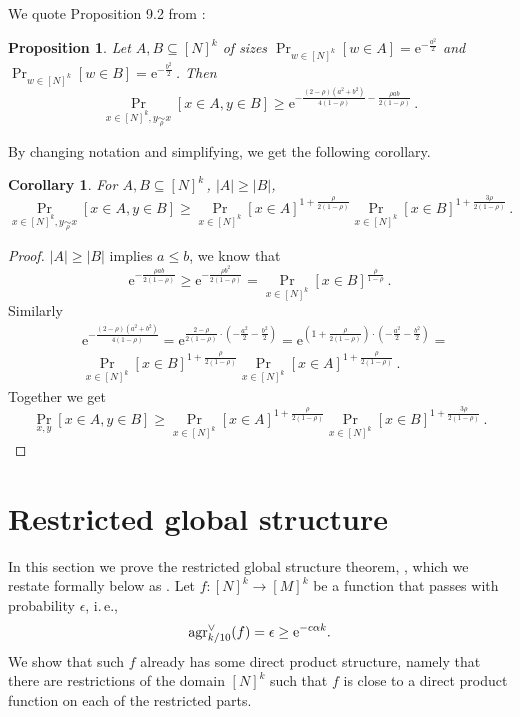 \documentclass[11pt]{article}
\numberwithin{equation}{section}
\newtheorem{proposition}[theorem]{Proposition}
\newtheorem{corollary}[theorem]{Corollary}
\theoremstyle{definition}
\theoremstyle{plain}
\newcommand{\eee}{\mathrm e}
\newcommand{\ie}{i.\,e.}
\newcommand\f{f} %
\newcommand{\test}[2]{
	\ifx &#2&
	\textrm{agr}^{#1}
	\else	
	\textrm{agr}^{#1}_{#2}
	\fi}
\newcommand\cor[1]{\underset{\scriptscriptstyle#1}{\sim}} %
\begin{document}
We quote Proposition 9.2 from \cite{mossel2013reverse}:
\begin{proposition}
  Let $A,B \subseteq [N]^k$ of sizes $\Pr_{w\in [N]^k}[w\in A] = \eee^{-\frac{a^2}{2}}$ and $\Pr_{w\in [N]^k}[w\in B] = \eee^{-\frac{b^2}{2}}$\,.
%
Then  %
	\[\Pr_{x\in [N]^k, y \cor{\rho}x}[x\in A,y\in B] \geq \eee^{-\frac{(2-\rho)(a^2+b^2)}{4(1-\rho)} - \frac{\rho ab}{2(1-\rho)}}\,.\] %
\end{proposition}
By changing %
notation  %
and simplifying, we get the following corollary.
\begin{corollary}\label{cor:reverse hyper}
	For $A,B \subseteq [N]^k$\,, $|A| \geq |B|$,
	\[\Pr_{x\in [N]^k, y \cor{\rho}x}[x\in A,y\in B] \geq \Pr_{x\in [N]^k}[x\in A]^{1 + \frac{\rho}{2(1-\rho)}}\Pr_{x\in [N]^k}[x\in B]^{1+\frac{3\rho}{2(1-\rho)}}\,.\] %
\end{corollary}

\begin{proof}
	$|A|\geq |B|$ implies $a\leq b$, we know that
	\[\eee^{-\frac{\rho a b}{2(1-\rho)}} \geq \eee^{-\frac{\rho b^2}{2(1-\rho)}} = \Pr_{x\in [N]^k}[x\in B]^{\frac{\rho}{1-\rho}}\,.\] %
	Similarly
	\begin{align*}
	&\eee^{-\frac{(2-\rho)(a^2+b^2)}{4(1-\rho)}} = \eee^{\frac{2-\rho}{2(1-\rho)}\cdot\left(-\frac{a^2}{2} - \frac{b^2}{2}\right)} =
	\eee^{\left(1 + \frac{\rho}{2(1-\rho)}\right)\cdot\left(-\frac{a^2}{2} - \frac{b^2}{2}\right)}=\\
	&\Pr_{x\in [N]^k}[x\in B]^{1+\frac{\rho}{2(1-\rho)}} \Pr_{x\in [N]^k}[x\in A]^{1+\frac{\rho}{2(1-\rho)}}\,. %
	\end{align*}
	Together we get
	\[\Pr_{x,y}[x\in A,y\in B] \geq \Pr_{x\in [N]^k}[x\in A]^{1 + \frac{\rho}{2(1-\rho)}}\Pr_{x\in [N]^k}[x\in B]^{1+\frac{3\rho}{2(1-\rho)}}\,.\] %
\end{proof}



\section{Restricted global structure}\label{sec:local}
In this section we prove the restricted global structure theorem, , which we restate formally below as . Let $\f:[N]^k\rightarrow[M]^k$ be a function that passes   with probability $\epsilon$, \ie, \[\test{\vee}{k/10}(\f) = \epsilon\geq \eee^{-c\alpha k}.\] We show that such $\f$ already has some direct product structure, namely  %
that there are restrictions of the domain $[N]^k$ such that $\f$ is close to a direct product function on each of the restricted parts.
\end{document}
